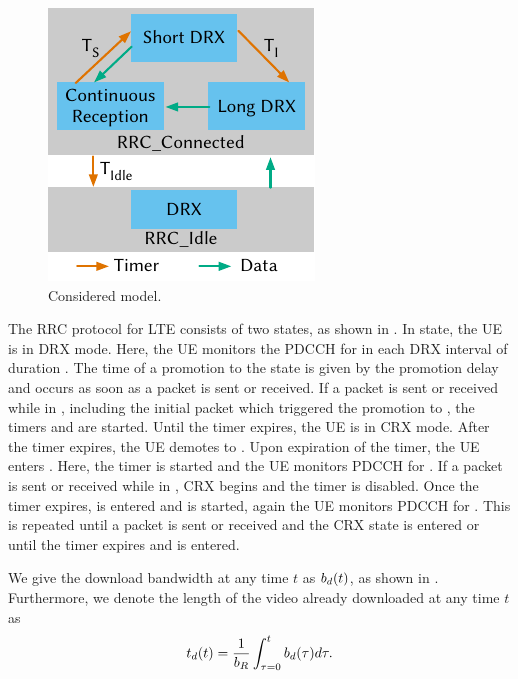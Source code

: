 \begin{figure}
\begin{center}
  \includegraphics{application/lte_video/system_model/figures/model_lte}
  \caption{Considered   model.}
  \label{fig:application:lte_video:system_model:lte_network_model:model_lte}
\end{center}
\end{figure}

The \gls{RRC} protocol for \gls{LTE} consists of two states, as shown in .
In \rrcidle state, the \gls{UE} is in \gls{DRX} mode.
Here, the \gls{UE} monitors the \gls{PDCCH} for \tonidle in each \gls{DRX} interval of duration \tdrxidle.
The time of a promotion to the \rrcconnected state is given by the promotion delay \promotiondelay and occurs as soon as a packet is sent or received.
If a packet is sent or received while in \rrcconnected, including the initial packet which triggered the promotion to \rrcconnected, the timers \tdrxinactivity and \tidle are started.
Until the \tdrxinactivity timer expires, the \gls{UE} is in \gls{CRX} mode.
After the \tidle timer expires, the \gls{UE} demotes to \rrcidle.
Upon expiration of the \tdrxinactivity timer, the \gls{UE} enters \shortdrx.
Here, the \tshortdrx timer is started and the \gls{UE} monitors \gls{PDCCH} for \ton.
If a packet is sent or received while in \shortdrx, \gls{CRX} begins and the \tshortdrx timer is disabled.
Once the \tshortdrx timer expires, \longdrx is entered and \tlongdrx is started, again the \gls{UE} monitors \gls{PDCCH} for \ton.
This is repeated until a packet is sent or received and the \gls{CRX} state is entered or until the \tidle timer expires and \rrcidle is entered.

We give the download bandwidth at any time \(t\) as \(b_d(t)\), as shown in .
Furthermore, we denote the length of the video already downloaded at any time \(t\) as 
\begin{equation}
t_d(t) = \frac{1}{b_R} \int_{\tau=0}^t b_d(\tau) d\mathrm{\tau}.
\end{equation}

